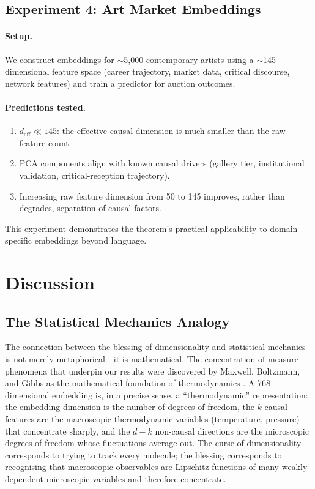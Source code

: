 \documentclass[11pt,a4paper]{article}
\theoremstyle{plain}
\theoremstyle{definition}
\theoremstyle{remark}
\newcommand{\deff}{d_{\mathrm{eff}}}
\begin{document}
\subsection{Experiment 4: Art Market Embeddings}\label{sec:exp-art}

\paragraph{Setup.}
We construct embeddings for $\sim$5{,}000 contemporary artists using a
$\sim$145-dimensional feature space (career trajectory, market data, critical
discourse, network features) and train a predictor for auction outcomes.

\paragraph{Predictions tested.}
\begin{enumerate}[leftmargin=2em,itemsep=2pt]
  \item $\deff \ll 145$: the effective causal dimension is much smaller than the
    raw feature count.
  \item PCA components align with known causal drivers (gallery tier,
    institutional validation, critical-reception trajectory).
  \item Increasing raw feature dimension from 50 to 145 improves, rather than
    degrades, separation of causal factors.
\end{enumerate}

This experiment demonstrates the theorem's practical applicability to
domain-specific embeddings beyond language.


\section{Discussion}\label{sec:discussion}

\subsection{The Statistical Mechanics Analogy}\label{sec:stat-mech}

The connection between the blessing of dimensionality and statistical mechanics
is not merely metaphorical---it is mathematical.  The concentration-of-measure
phenomena that underpin our results were discovered by Maxwell, Boltzmann, and
Gibbs as the mathematical foundation of thermodynamics
\citep{gorban2018blessing}.  A 768-dimensional embedding is, in a precise sense,
a ``thermodynamic'' representation: the embedding dimension is the number of
degrees of freedom, the $k$ causal features are the macroscopic thermodynamic
variables (temperature, pressure) that concentrate sharply, and the $d-k$
non-causal directions are the microscopic degrees of freedom whose fluctuations
average out.  The curse of dimensionality corresponds to trying to track every
molecule; the blessing corresponds to recognising that macroscopic observables are
Lipschitz functions of many weakly-dependent microscopic variables and therefore
concentrate.
\end{document}
